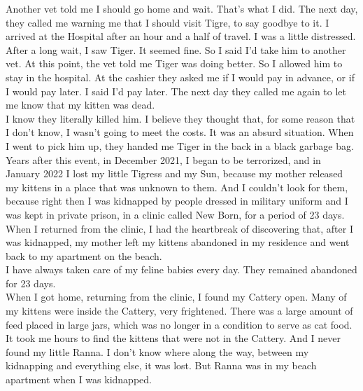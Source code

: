 \documentclass[11pt]{book}
\begin{document}
\noindent Another vet told me I should go home and wait. That's what I did. The next day, they called me warning me that I should visit Tigre, to say goodbye to it. I arrived at the Hospital after an hour and a half of travel. I was a little distressed. After a long wait, I saw Tiger. It seemed fine. So I said I'd take him to another vet. At this point, the vet told me Tiger was doing better. So I allowed him to stay in the hospital. At the cashier they asked me if I would pay in advance, or if I would pay later. I said I'd pay later. The next day they called me again to let me know that my kitten was dead. \\

\noindent I know they literally killed him. I believe they thought that, for some reason that I don't know, I wasn't going to meet the costs. It was an absurd situation. When I went to pick him up, they handed me Tiger in the back in a black garbage bag. \\

\noindent Years after this event, in December 2021, I began to be terrorized, and in January 2022 I lost my little Tigress and my Sun, because my mother released my kittens in a place that was unknown to them. And I couldn't look for them, because right then I was kidnapped by people dressed in military uniform and I was kept in private prison, in a clinic called New Born, for a period of 23 days. \\

\noindent When I returned from the clinic, I had the heartbreak of discovering that, after I was kidnapped, my mother left my kittens abandoned in my residence and went back to my apartment on the beach. \\

\noindent I have always taken care of my feline babies every day. They remained abandoned for 23 days.\\

\noindent When I got home, returning from the clinic, I found my Cattery open. Many of my kittens were inside the Cattery, very frightened. There was a large amount of feed placed in large jars, which was no longer in a condition to serve as cat food. \\

\noindent It took me hours to find the kittens that were not in the Cattery. And I never found my little Ranna. I don't know where along the way, between my kidnapping and everything else, it was lost. But Ranna was in my beach apartment when I was kidnapped. \\
\end{document}
